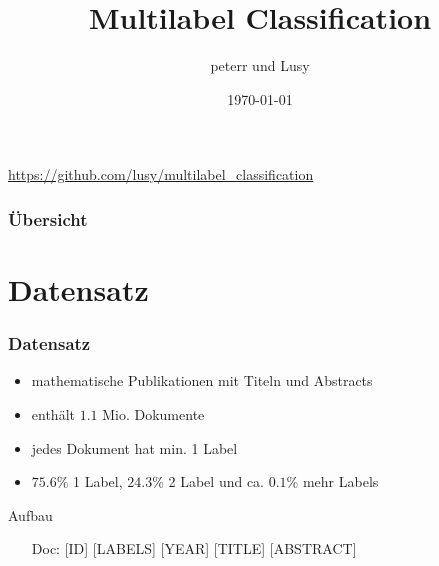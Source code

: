 \documentclass[12pt, xcolor=table]{beamer}
\begin{document}
\title{Multilabel Classification}
\author{peterr und Lusy}
\date{\today}

\begin{frame}
    \titlepage
    \begin{block}
        \tiny \url{https://github.com/lusy/multilabel\_classification}
    \end{block}
\end{frame}

\begin{frame}
    \frametitle{Übersicht}
    \tableofcontents
\end{frame}

\section{Datensatz}
\begin{frame}
    \frametitle{Datensatz}
    \begin{itemize}
        \item mathematische Publikationen mit Titeln und Abstracts
        \item enthält  $1.1$ Mio. Dokumente
        \item jedes Dokument hat min. 1 Label
        \item $75.6 \%$ 1 Label, $24.3 \%$ 2 Label und ca. $0.1 \%$ mehr Labels
    \end{itemize}
    \begin{block}{Aufbau}
        \begin{itemize}
            \item[Doc:] [ID] [LABELS] [YEAR] [TITLE] [ABSTRACT]
        \end{itemize}
    \end{block}
\end{frame}
\end{document}
